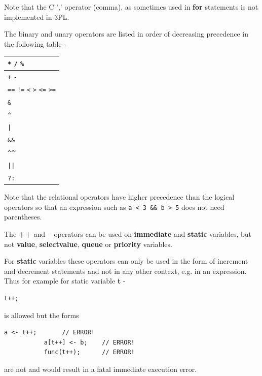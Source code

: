         Note that the C ',' operator (comma), as sometimes used in {\bf for} statements is
        not implemented in 3PL.




        The binary and unary operators are listed in order of decreasing
        precedence in the following table -

        \begin{tabular}{| l |}
        \hline
        \verb'*' \verb'/' \verb'%' \\ \hline
        \verb'+' \verb'-' \\ \hline
        \verb'==' \verb'!=' \verb'<' \verb'>' \verb'<=' \verb'>=' \\ \hline
        \verb'&' \\ \hline
        \verb'^' \\ \hline
        \verb'|' \\ \hline
        \verb'&&' \\ \hline
        \verb'^^' \\ \hline
        \verb'||' \\ \hline
        \verb'?:' \\ \hline
        \end{tabular}

        Note that the relational operators have higher precedence than the
        logical operators so that an expression such as \verb'a < 3 && b > 5'
        does not need parentheses.

        The {\bf ++} and {\bf --} operators can be used on {\bf immediate}
        and {\bf static} variables, but not {\bf value}, {\bf selectvalue},
        {\bf queue} or {\bf priority} variables.
        
        For {\bf static} variables these operators can only be used in the form of
        increment and decrement statements and not in any other context, e.g. in an
        expression. Thus for example for static variable {\bf t} -
        \begin{lstlisting}[gobble=8, language=threepl]
           t++;
        \end{lstlisting}
        is allowed but the forms
        \begin{lstlisting}[gobble=8, language=threepl]
           a <- t++;       // ERROR!
           a[t++] <- b;    // ERROR!
           func(t++);      // ERROR!
        \end{lstlisting}
        are not and would result in a fatal immediate execution error.
        
